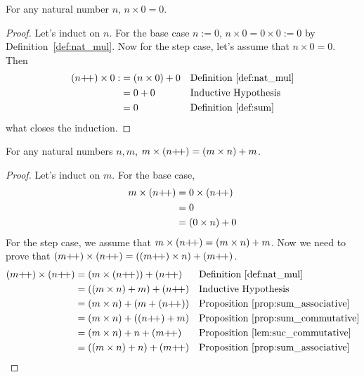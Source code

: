 \begin{subsequence}
    \begin{lemma}
        For any natural number $n$, $n \times 0 = 0$.\label{lem:nat_mul_0_commutative}     
    \end{lemma}
    \begin{proof}
        Let's induct on $n$. For the base case $n:=0$, $n \times 0 = 0 \times 0 := 0$ by Definition~\ref{def:nat_mul}. Now for the step case, let's assume that $n \times 0 = 0$. Then 
        \begin{align*}
            \left(n\operatorname{\!+\!+}\right) \times 0:&= \left(n \times 0\right) + 0 && \text{Definition~\ref{def:nat_mul}}\\
            &=0 + 0 && \text{Inductive Hypothesis}\\
            &=0 &&\text{Definition~\ref{def:sum}}
        \end{align*}
        what closes the induction.
    \end{proof}
    \begin{lemma}
        For any natural numbers $n,m$, $m \times (n\operatorname{\!+\!+}) = (m \times n) + m$\label{lem:nat_suc_mul_commutative}.
    \end{lemma}
    \begin{proof}
        Let's induct on $m$. For the base case, 
        \begin{align*}
            m \times (n\operatorname{\!+\!+}) &= 0 \times (n\operatorname{\!+\!+})\\
            &= 0\\
            &= (0 \times n) + 0
        \end{align*}
        For the step case, we assume that $m \times (n\operatorname{\!+\!+}) = (m\times n) + m$. Now we need to prove that $(m\next) \times (n\next) = ((m\next)\times n) + (m\next)$.
        \begin{align*}
            (m\next) \times (n\next) &= (m\times (n\next)) + (n\next) && \text{Definition~\ref{def:nat_mul}}\\
            &=((m \times n) + m) + (n\next) && \text{Inductive Hypothesis}\\
            &= (m \times n) + (m + (n\next)) && \text{Proposition~\ref{prop:sum_associative}}\\
            &= (m \times n) + ((n\next) + m) && \text{Proposition~\ref{prop:sum_commutative}}\\
            &= (m \times n) + n + (m\next) && \text{Proposition~\ref{lem:suc_commutative}}\\
            &= ((m \times n) + n) + (m\next) && \text{Proposition~\ref{prop:sum_associative}}\\

\end{align*}
\end{proof}
\end{subsequence}

